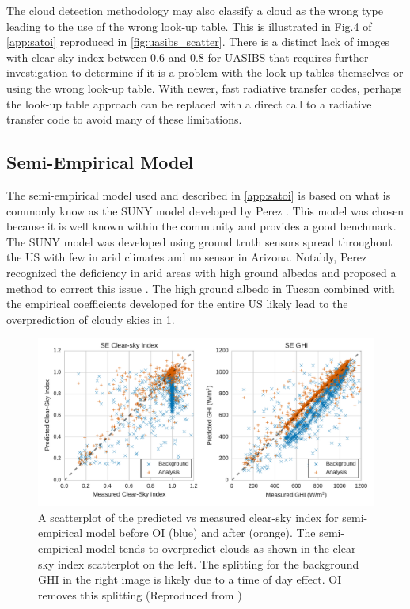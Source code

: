 The cloud detection methodology may also classify a cloud as the wrong
type leading to the use of the wrong look-up table.
This is illustrated in Fig.\@ 4 of \cref{app:satoi} reproduced in
\cref{fig:uasibs_scatter}.
There is a distinct lack of images with clear-sky index between 0.6
and 0.8 for UASIBS that requires further investigation to determine if
it is a problem with the look-up tables themselves or using the wrong
look-up table.
With newer, fast radiative transfer codes, perhaps the look-up table
approach can be replaced with a direct call to a radiative transfer
code to avoid many of these limitations.

\subsection{Semi-Empirical Model}
The semi-empirical model used and described in \cref{app:satoi} is
based on what is commonly know as the SUNY model developed by Perez
\etal \citep{Perez2002}.
This model was chosen because it is well known within the community
and provides a good benchmark.
The SUNY model was developed using ground truth sensors spread
throughout the US with few in arid climates and no sensor in Arizona.
Notably, Perez \etal recognized the deficiency in arid areas with high
ground albedos and proposed a method to correct this issue
\citep{Perez2004}.
The high ground albedo in Tucson combined with the empirical
coefficients developed for the entire US likely lead to the
overprediction of cloudy skies in \cref{fig:suny_scatter}.

\begin{figure}[tb]
\centering
\includegraphics[width=\textwidth]{figs/suny_scatter.pdf}
\caption[Scatterplot of predicted vs measured clear-sky index for the
semi-empirical model]{A scatterplot of the predicted vs measured
  clear-sky index for semi-empirical model before OI (blue) and after
  (orange). The semi-empirical model tends to overpredict clouds as
  shown in the clear-sky index scatterplot on the left. The splitting
  for the background GHI in the right image is likely due to a time of day
  effect.  OI removes this splitting (Reproduced from
  \cite{Lorenzo2017})}
\label{fig:suny_scatter}
\end{figure}

